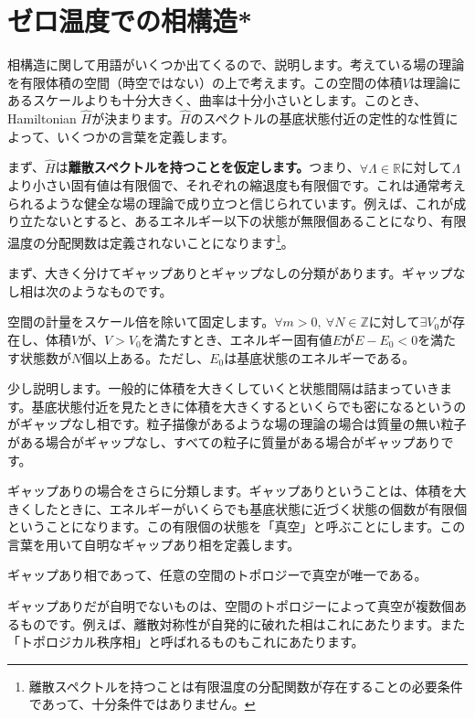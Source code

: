 \documentclass[report,paper=a4, fontsize=12pt, line_length=16cm, number_of_lines=33,dvipdfmx]{jlreq}
\newcommand{\kyou}[1]{{\sffamily \bfseries #1}}
\numberwithin{equation}{chapter}
\newcommand{\Zb}{\mathbb{Z}}
\newcommand{\Hh}{\widehat{H}}
\newcommand{\Rb}{\mathbb{R}}
\begin{document}
\section{ゼロ温度での相構造*}

相構造に関して用語がいくつか出てくるので、説明します。考えている場の理論を有限体積の空間（時空ではない）の上で考えます。この空間の体積$V$は理論にあるスケールよりも十分大きく、曲率は十分小さいとします。このとき、Hamiltonian $\Hh$が決まります。$\Hh$のスペクトルの基底状態付近の定性的な性質によって、いくつかの言葉を定義します。

まず、$\Hh$は\kyou{離散スペクトルを持つことを仮定します。}つまり、$\forall \Lambda\in \Rb$に対して$\Lambda$より小さい固有値は有限個で、それぞれの縮退度も有限個です。これは通常考えられるような健全な場の理論で成り立つと信じられています。例えば、これが成り立たないとすると、あるエネルギー以下の状態が無限個あることになり、有限温度の分配関数は定義されないことになります\footnote{離散スペクトルを持つことは有限温度の分配関数が存在することの必要条件であって、十分条件ではありません。}。

まず、大きく分けてギャップありとギャップなしの分類があります。ギャップなし相は次のようなものです。
\begin{proposition}[ギャップなし相]
  空間の計量をスケール倍を除いて固定します。$\forall m>0,\ \forall N\in \Zb$に対して$\exists V_0$が存在し、体積$V$が、$V>V_0$を満たすとき、エネルギー固有値$E$が$E-E_0 <0$を満たす状態数が$N$個以上ある。ただし、$E_0$は基底状態のエネルギーである。
\end{proposition}
少し説明します。一般的に体積を大きくしていくと状態間隔は詰まっていきます。基底状態付近を見たときに体積を大きくするといくらでも密になるというのがギャップなし相です。粒子描像があるような場の理論の場合は質量の無い粒子がある場合がギャップなし、すべての粒子に質量がある場合がギャップありです。

ギャップありの場合をさらに分類します。ギャップありということは、体積を大きくしたときに、エネルギーがいくらでも基底状態に近づく状態の個数が有限個ということになります。この有限個の状態を「真空」と呼ぶことにします。この言葉を用いて自明なギャップあり相を定義します。
\begin{proposition}[自明なギャップあり相]
  ギャップあり相であって、任意の空間のトポロジーで真空が唯一である。  
\end{proposition}
ギャップありだが自明でないものは、空間のトポロジーによって真空が複数個あるものです。例えば、離散対称性が自発的に破れた相はこれにあたります。また「トポロジカル秩序相」と呼ばれるものもこれにあたります。
\end{document}
